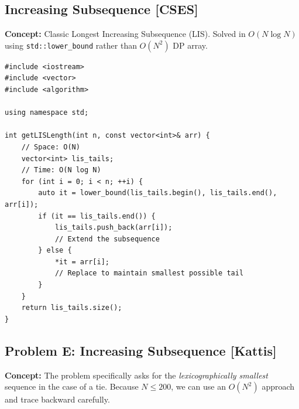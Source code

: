 \subsection{Increasing Subsequence [CSES]}
\textbf{Concept:} Classic Longest Increasing Subsequence (LIS). Solved in $O(N \log N)$ using \texttt{std::lower\_bound} rather than $O(N^2)$ DP array.

\begin{lstlisting}
#include <iostream>
#include <vector>
#include <algorithm>

using namespace std;

int getLISLength(int n, const vector<int>& arr) {
    // Space: O(N)
    vector<int> lis_tails;
    // Time: O(N log N)
    for (int i = 0; i < n; ++i) {
        auto it = lower_bound(lis_tails.begin(), lis_tails.end(), arr[i]);
        if (it == lis_tails.end()) {
            lis_tails.push_back(arr[i]);
            // Extend the subsequence
        } else {
            *it = arr[i];
            // Replace to maintain smallest possible tail
        }
    }
    return lis_tails.size();
}
\end{lstlisting}

\subsection{Problem E: Increasing Subsequence [Kattis]}
\textbf{Concept:} The problem specifically asks for the \textit{lexicographically smallest} sequence in the case of a tie.
Because $N \le 200$, we can use an $O(N^2)$ approach and trace backward carefully.

